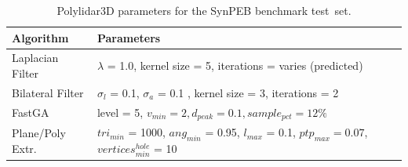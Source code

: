 \begin{table}[H]
\centering
\caption{Polylidar3D parameters for the SynPEB benchmark test~set.}\label{table:ch3_synpeb_parameters}
\begin{tabular}{@{}ll@{}}
\toprule
\textbf{Algorithm}        & \textbf{Parameters}                                                          \\ \midrule
Laplacian Filter & $\lambda$ = 1.0, kernel size = 5, iterations = varies (predicted)   \\
Bilateral Filter & $\sigma_l$ = 0.1, $\sigma_a$ = 0.1 , kernel size = 3, iterations = 2 \\
FastGA           & level = 5,  $v_{min} = 2, d_{peak} = 0.1, sample_{pct} = 12\%$            \\
Plane/Poly Extr.      & $tri_{min}$ = 1000, $ang_{min}$ = 0.95, $l_{max}$ = 0.1, $ptp_{max} = 0.07$, $vertices^{hole}_{min}$ = 10     \\ \bottomrule
\end{tabular}
\end{table}


